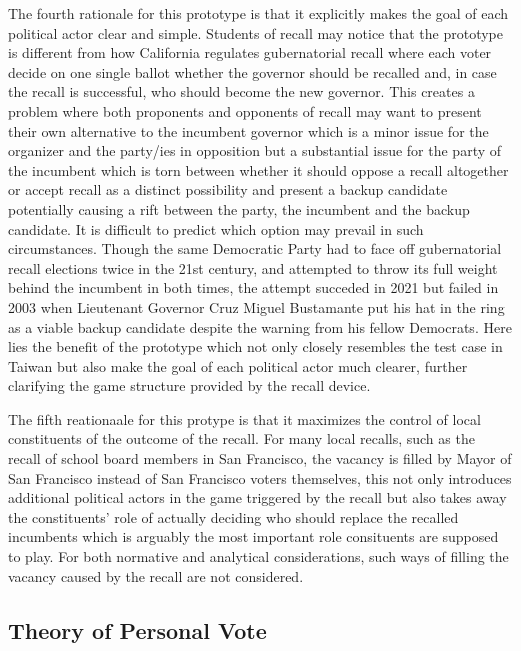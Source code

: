 \documentclass[hyphens, crop=false]{standalone}
\begin{document}
		The fourth rationale for this prototype is that it explicitly makes the goal of each
		political actor clear and simple.
		Students of recall may notice that the prototype is different from how California regulates gubernatorial recall
		where each voter decide on one single ballot
		whether the governor should be recalled
		and,
		in case the recall is successful,
		who should become the new governor.
		This creates a problem where both proponents and opponents of recall may want to present their own alternative to the incumbent governor
		which is a minor issue for the organizer and the party/ies in opposition
		but a substantial issue for the party of the incumbent which is torn between
		whether it should oppose a recall altogether or accept recall as a distinct possibility and present a backup candidate
		potentially causing a rift between the party, the incumbent and the backup candidate.
		It is difficult to predict which option may prevail in such circumstances.
		Though the same Democratic Party had to face off gubernatorial recall elections twice in the 21st century,
		and attempted to throw its full weight behind the incumbent in both times,
		the attempt succeded in 2021
		but failed in 2003
		when
		Lieutenant Governor Cruz Miguel Bustamante put his hat in the ring as a viable backup candidate
		despite the warning from his fellow Democrats.
		Here lies the benefit of the prototype which not only closely resembles the test case in Taiwan
		but also make the goal of each political actor much clearer,
		further clarifying the game structure provided by the recall device.

		The fifth reationaale for this protype is that it maximizes the control of local constituents of the outcome of the recall.
		For many local recalls, such as the recall of school board members in San Francisco,
		the vacancy is filled by Mayor of San Francisco instead of San Francisco voters themselves,
		this not only introduces additional political actors in the game triggered by the recall
		but also takes away the constituents' role of actually deciding who should replace the recalled incumbents
		which is arguably the most important role consituents are supposed to play.
		For both normative and analytical considerations, such ways of filling the vacancy caused by the recall are not considered.
		
		
	
		\subsection*{Theory of Personal Vote}
		
\end{document}
